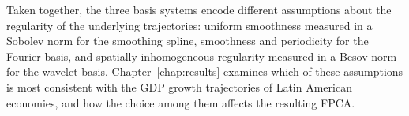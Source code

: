 Taken together, the three basis systems encode different assumptions about
the regularity of the underlying trajectories: uniform smoothness measured in
a Sobolev norm for the smoothing spline, smoothness and periodicity for the
Fourier basis, and spatially inhomogeneous regularity measured in a Besov
norm for the wavelet basis. Chapter~\ref{chap:results} examines which of these
assumptions is most consistent with the GDP growth trajectories of Latin
American economies, and how the choice among them affects the resulting
FPCA.

